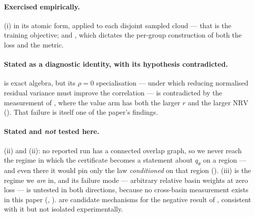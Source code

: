 \paragraph{Exercised empirically.} (i) in its atomic form,
applied to each disjoint sampled cloud --- that is the training objective; and
, which dictates the per-group construction of both the loss
and the metric.

\paragraph{Stated as a diagnostic identity, with its hypothesis contradicted.}
 is exact algebra, but its $\rho = 0$ specialisation --- under
which reducing normalised residual variance must improve the correlation --- is
contradicted by the measurement of , where the value arm has both
the larger $r$ and the larger $\mathrm{NRV}$ (). That failure is
itself one of the paper's findings.

\paragraph{Stated and \emph{not} tested here.} (ii) and
(ii): no reported run has a connected overlap graph, so we never
reach the regime in which the certificate becomes a statement about $q_\theta$ on a
region --- and even there it would pin only the law \emph{conditioned} on that
region (). (iii) is the regime we \emph{are} in,
and its failure mode --- arbitrary relative basin weights at zero loss --- is
untested in both directions, because no cross-basin measurement exists in this
paper (, ).
 are candidate mechanisms for the negative result of
, consistent with it but not isolated experimentally.

